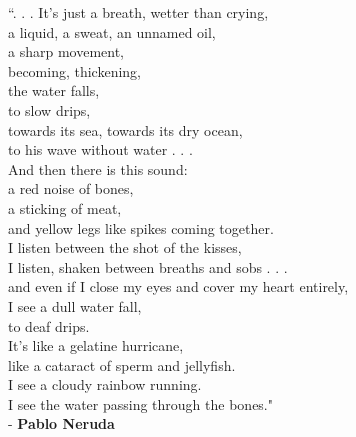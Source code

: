 \documentclass[12pt]{article}
\begin{document}
\begingroup
\begin{center}
``. . . It's just a breath, wetter than crying, \\
a liquid, a sweat, an unnamed oil, \\
a sharp movement, \\
becoming, thickening, \\
the water falls, \\
to slow drips, \\
towards its sea, towards its dry ocean, \\
to his wave without water . . . \\
And then there is this sound: \\
a red noise of bones, \\
a sticking of meat, \\
and yellow legs like spikes coming together. \\
I listen between the shot of the kisses, \\
I listen, shaken between breaths and sobs . . .  \\
and even if I close my eyes and cover my heart entirely, \\
I see a dull water fall, \\
to deaf drips. \\
It's like a gelatine hurricane, \\
like a cataract of sperm and jellyfish. \\
I see a cloudy rainbow running. \\
I see the water passing through the bones." \\
- \textbf{Pablo Neruda}
\end{center}
\endgroup
\end{document}
